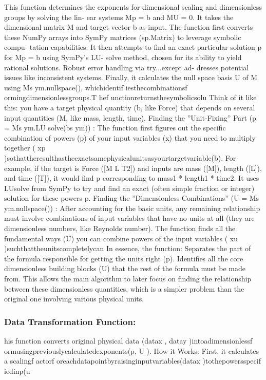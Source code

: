 \documentclass{article}
\begin{document}
{This function determines the exponents for dimensional scaling and dimensionless groups by solving the lin-
ear systems Mp = b and MU = 0. It takes the dimensional matrix M and target vector b as input. The
function first converts these NumPy arrays into SymPy matrices (sp.Matrix) to leverage symbolic compu-
tation capabilities. It then attempts to find an exact particular solution p for Mp = b using SymPy’s LU-
solve method, chosen for its ability to yield rational solutions. Robust error handling via try...except ad-
dresses potential issues like inconsistent systems. Finally, it calculates the null space basis U of M using
Ms ym.nullspace(), whichidentif iesthecombinationsf ormingdimensionlessgroups.T hef unctionreturnsthesymbolicsolu
Think of it like this: you have a target physical quantity (b, like Force) that depends on several input quantities
(M, like mass, length, time).
Finding the ”Unit-Fixing” Part (p = Ms ym.LU solve(bs ym)) :
The function first figures out the specific combination of powers (p) of your input variables (x) that you need to
multiply together ( xp )sothattheresulthastheexactsamephysicalunitsasyourtargetvariable(b).
For example, if the target is Force ([M L T2]) and inputs are mass ([M]), length ([L]), and time ([T]), it would
find p corresponding to mass1 * length1 * time2.
It uses LUsolve from SymPy to try and find an exact (often simple fraction or integer) solution for these powers
p.
Finding the ”Dimensionless Combinations” (U = Ms ym.nullspace()) :
After accounting for the basic units, any remaining relationship must involve combinations of input variables
that have no units at all (they are dimensionless numbers, like Reynolds number).
The function finds all the fundamental ways (U) you can combine powers of the input variables ( xu )suchthattheunitscompletelycan
In essence, the function:
Separates the part of the formula responsible for getting the units right (p).
Identifies all the core dimensionless building blocks (U) that the rest of the formula must be made from.
This allows the main algorithm to later focus on finding the relationship between these dimensionless quantities,
which is a simpler problem than the original one involving various physical units. 



\subsubsection{Data Transformation Function:}
his function converts original physical data (datax , datay )intoadimensionlessf ormusingpreviouslycalculatedexponents(p, U ).
How it Works: First, it calculates a scalingf actorf oreachdatapointbyraisinginputvariables(datax )tothepowersspecif iedinp(u\\



}
\end{document}
